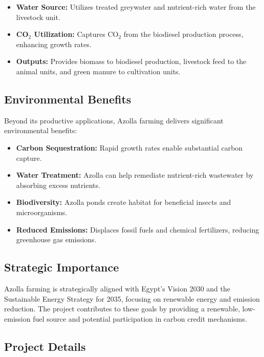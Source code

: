 \begin{itemize}
    \item \textbf{Water Source:} Utilizes treated greywater and nutrient-rich water from the livestock unit.
    
    \item \textbf{CO$_2$ Utilization:} Captures CO$_2$ from the biodiesel production process, enhancing growth rates.
    
    \item \textbf{Outputs:} Provides biomass to biodiesel production, livestock feed to the animal units, and green manure to cultivation units.
\end{itemize}

\subsection{Environmental Benefits}

Beyond its productive applications, Azolla farming delivers significant environmental benefits:

\begin{itemize}
    \item \textbf{Carbon Sequestration:} Rapid growth rates enable substantial carbon capture.
    
    \item \textbf{Water Treatment:} Azolla can help remediate nutrient-rich wastewater by absorbing excess nutrients.
    
    \item \textbf{Biodiversity:} Azolla ponds create habitat for beneficial insects and microorganisms.
    
    \item \textbf{Reduced Emissions:} Displaces fossil fuels and chemical fertilizers, reducing greenhouse gas emissions.
\end{itemize}

\subsection{Strategic Importance}

Azolla farming is strategically aligned with Egypt's Vision 2030 and the Sustainable Energy Strategy for 2035, focusing on renewable energy and emission reduction. The project contributes to these goals by providing a renewable, low-emission fuel source and potential participation in carbon credit mechanisms.

\subsection{Project Details}

